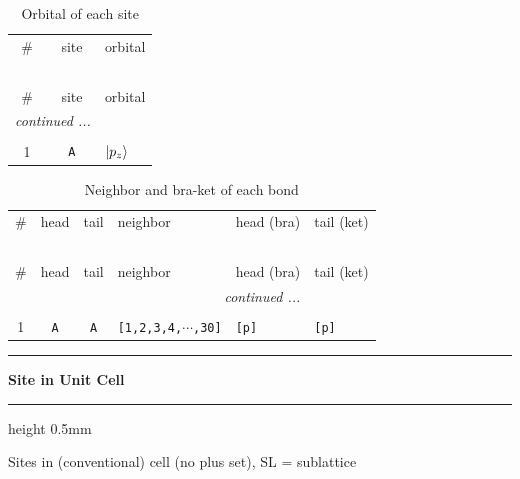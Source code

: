 \documentclass[fleqn,10pt,landscape]{jsarticle}
\begin{document}
\renewcommand{\arraystretch}{1.6}
\begin{longtable}[l]{ccl}
\captionsetup{justification=raggedright, singlelinecheck=off}
\caption{Orbital of each site}
 \\
 \hline \hline
\# & site & orbital \\ \hline \endfirsthead

\multicolumn{2}{l}{\tablename\ \thetable{}} \\
 \hline \hline
\# & site & orbital \\ \hline \endhead

 \hline \hline
\multicolumn{2}{r}{\footnotesize\it continued ...} \\ \endfoot

 \hline \hline
\multicolumn{2}{r}{} \\ \endlastfoot

1 & \texttt{A} & $\ket{p_{z}}$ \\
\end{longtable}
\renewcommand{\arraystretch}{1.6}
\begin{longtable}[l]{ccclll}
\captionsetup{justification=raggedright, singlelinecheck=off}
\caption{Neighbor and bra-ket of each bond}
 \\
 \hline \hline
\# & head & tail & neighbor & head (bra) & tail (ket) \\ \hline \endfirsthead

\multicolumn{5}{l}{\tablename\ \thetable{}} \\
 \hline \hline
\# & head & tail & neighbor & head (bra) & tail (ket) \\ \hline \endhead

 \hline \hline
\multicolumn{5}{r}{\footnotesize\it continued ...} \\ \endfoot

 \hline \hline
\multicolumn{5}{r}{} \\ \endlastfoot

1 & \texttt{A} & \texttt{A} & \texttt{[1,2,3,4,$\cdots$,30]} & \texttt{[p]} & \texttt{[p]} \\
\end{longtable}
\vspace{5mm}
\noindent \rule[0.5mm]{5mm}{0.5mm}\hspace{3mm}\textbf{Site in Unit Cell}\hspace{3mm}\leaders\hrule height 0.5mm\hfill\kern0pt
\vspace{3mm}

\noindent Sites in (conventional) cell (no plus set), SL = sublattice
\end{document}
